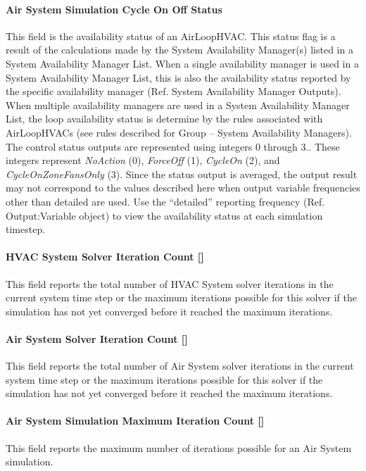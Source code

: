 \paragraph{Air System Simulation Cycle On Off Status}\label{air-system-simulation-cycle-on-off-status}

This field is the availability status of an AirLoopHVAC. This status flag is a result of the calculations made by the System Availability Manager(s) listed in a System Availability Manager List. When a single availability manager is used in a System Availability Manager List, this is also the availability status reported by the specific availability manager (Ref. System Availability Manager Outputs). When multiple availability managers are used in a System Availability Manager List, the loop availability status is determine by the rules associated with AirLoopHVACs (see rules described for Group -- System Availability Managers). The control status outputs are represented using integers 0 through 3.. These integers represent \emph{NoAction} (0), \emph{ForceOff} (1), \emph{CycleOn} (2), and \emph{CycleOnZoneFansOnly} (3). Since the status output is averaged, the output result may not correspond to the values described here when output variable frequencies other than detailed are used. Use the ``detailed'' reporting frequency (Ref. Output:Variable object) to view the availability status at each simulation timestep.

\paragraph{HVAC System Solver Iteration Count {[]}}\label{hvac-system-solver-iteration-count}
This field reports the total number of HVAC System solver iterations in the current system time step or the maximum iterations possible for this solver if the simulation has not yet converged before it reached the maximum iterations.

\paragraph{Air System Solver Iteration Count {[]}}\label{air-system-solver-iteration-count}
This field reports the total number of Air System solver iterations in the current system time step or the maximum iterations possible for this solver if the simulation has not yet converged before it reached the maximum iterations.

\paragraph{Air System Simulation Maximum Iteration Count {[]}}\label{air-system-simulation-maximum-iteration-count}
This field reports the maximum number of iterations possible for an Air System simulation.

